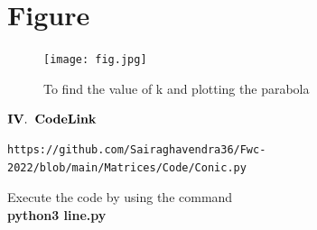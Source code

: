 \documentclass[journal,12pt,twocolumn]{IEEEtran}
\let\vec\mathbf
\begin{document}
\pagebreak\section{Figure}
\begin{figure}[h]
\texttt{[image: fig.jpg]}
\caption{To find the value of k and plotting the parabola}
    \label{fig:my_label}
\end{figure}


\begin{center}
$\vec{IV.\hspace{.2cm} Code Link}$
\end{center}
\begin{lstlisting}
https://github.com/Sairaghavendra36/Fwc-2022/blob/main/Matrices/Code/Conic.py
\end{lstlisting}
Execute the code by using the command\\
\textbf{python3 line.py}
\end{document}
